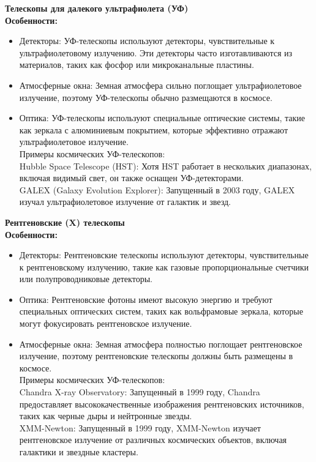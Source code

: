 \documentclass[12pt]{article}
\begin{document}
	     
	\textbf{Телескопы для далекого ультрафиолета (УФ)}\\
	\textbf{Особенности:}
	\begin{itemize}
	\item Детекторы: УФ-телескопы используют детекторы, чувствительные к ультрафиолетовому излучению. Эти детекторы часто изготавливаются из материалов, таких как фосфор или микроканальные пластины.
	\item Атмосферные окна: Земная атмосфера сильно поглощает ультрафиолетовое излучение, поэтому УФ-телескопы обычно размещаются в космосе.
	\item Оптика: УФ-телескопы используют специальные оптические системы, такие как зеркала с алюминиевым покрытием, которые эффективно отражают ультрафиолетовое излучение.\\
	
	Примеры космических УФ-телескопов:\\
	
	Hubble Space Telescope (HST): Хотя HST работает в нескольких диапазонах, включая видимый свет, он также оснащен УФ-детекторами.\\
	GALEX (Galaxy Evolution Explorer): Запущенный в 2003 году, GALEX изучал ультрафиолетовое излучение от галактик и звезд.
	\end{itemize}\newpage
	\textbf{Рентгеновские (X) телескопы}\\
	\textbf{Особенности:}
	\begin{itemize}
		\item Детекторы: Рентгеновские телескопы используют детекторы, чувствительные к рентгеновскому излучению, такие как газовые пропорциональные счетчики или полупроводниковые детекторы.
		\item Оптика: Рентгеновские фотоны имеют высокую энергию и требуют специальных оптических систем, таких как вольфрамовые зеркала, которые могут фокусировать рентгеновское излучение.
		\item Атмосферные окна: Земная атмосфера полностью поглощает рентгеновское излучение, поэтому рентгеновские телескопы должны быть размещены в космосе.\\
		
		Примеры космических УФ-телескопов:\\
		
		Chandra X-ray Observatory: Запущенный в 1999 году, Chandra предоставляет высококачественные изображения рентгеновских источников, таких как черные дыры и нейтронные звезды.\\
		XMM-Newton: Запущенный в 1999 году, XMM-Newton изучает рентгеновское излучение от различных космических объектов, включая галактики и звездные кластеры.
	\end{itemize}
	
\end{document}
